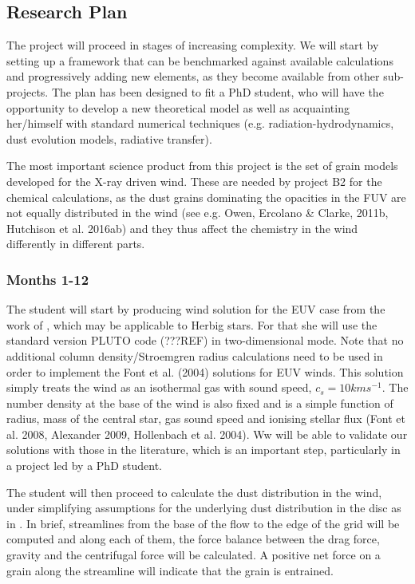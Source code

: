 \documentclass[10pt,fleqn,twoside]{article}
\begin{document}
\subsection{Research Plan} 

The project will proceed in stages of increasing complexity. We will start
by setting up a framework that can be benchmarked against available
calculations and progressively adding new elements, as they become
available from other sub-projects. The plan has been designed to fit a
PhD student, who will have the opportunity to develop a new theoretical
model as well as acquainting her/himself with standard numerical
techniques (e.g. radiation-hydrodynamics, dust evolution models,
radiative transfer). 

The most important science product from this project is the set of
grain models developed for the  X-ray driven wind. These are needed by
project B2 for the chemical calculations, as the dust
grains dominating the opacities in the FUV are not equally distributed
in the wind (see e.g. Owen, Ercolano \& Clarke, 2011b, Hutchison et
al. 2016ab) and they thus affect the chemistry in the wind
differently in different parts. 

\subsubsection{Months 1-12}
The student will start by producing wind solution for the EUV case
from the work of \citet{2004ApJ...607..890F}, which may be applicable
to Herbig stars. For that she will use the standard version PLUTO code (???REF) in
two-dimensional mode. Note that no additional column density/Stroemgren radius
calculations need to be used in order to implement the Font et
al. (2004) solutions for EUV winds. This solution simply treats the
wind as an isothermal gas with sound speed, $c_s = 10km s^{-1}$. The
number density at the base of the wind is also fixed and is a simple
function of radius, mass of the central star, gas sound speed and
ionising stellar flux (Font et al. 2008, Alexander 2009, Hollenbach et
al. 2004). Ww will be able to validate our solutions with those in the
literature, which is an important step, particularly in a project led
by a PhD student. 

The student will then proceed to calculate the dust
distribution in the wind, under simplifying assumptions for the
underlying dust distribution in the disc as in \citet{2011MNRAS.411.1104O}. In
brief, streamlines from the base of the flow to the edge of the grid
will be computed and along each of them, the force balance between the
drag force, gravity and the centrifugal force will be calculated. A
positive net force on a grain along the streamline will indicate that
the grain is entrained.
\end{document}
